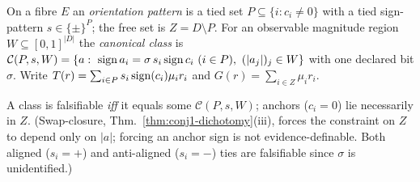 \begin{definition}\label{def:orient}
On a fibre $E$ an \emph{orientation pattern} is a tied set $P\subseteq\{i:c_i\neq0\}$ with a tied
sign-pattern $s\in\{\pm\}^{P}$; the free set is $Z=D\setminus P$. For an observable magnitude region
$W\subseteq[0,1]^{|D|}$ the \emph{canonical class} is
$\mathcal C(P,s,W)=\{a:\ \operatorname{sign} a_i=\sigma\,s_i\operatorname{sign} c_i\ (i\in P),\ (|a_j|)_j\in W\}$ with one
declared bit $\sigma$. Write $T(r)=\sum_{i\in P}s_i\operatorname{sign}(c_i)\mu_i r_i$ and
$G(r)=\sum_{i\in Z}\mu_i r_i$.
\end{definition}

\begin{lemma}\label{lem:canonform}
A class is falsifiable \emph{iff} it equals some $\mathcal C(P,s,W)$; anchors ($c_i=0$) lie
necessarily in $Z$. \textnormal{(Swap-closure, Thm.~\ref{thm:conj1-dichotomy}(iii), forces the
constraint on $Z$ to depend only on $|a|$; forcing an anchor sign is not evidence-definable. Both
aligned ($s_i{=}+$) and anti-aligned ($s_i{=}-$) ties are falsifiable since $\sigma$ is
unidentified.)}
\end{lemma}

